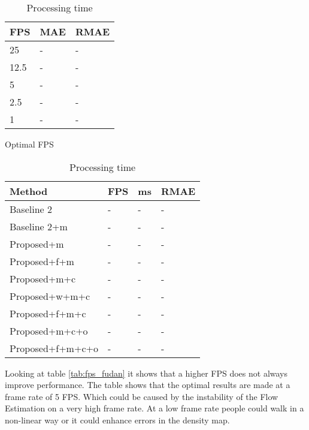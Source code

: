 \begin{table}[!htb]
\begin{minipage}{.5\linewidth}
\centering
\begin{tabular}{lll}
		\hline
		FPS                               & MAE & RMAE \\ \hline
		\multicolumn{1}{l|}{25}          & - & - \\
		\multicolumn{1}{l|}{12.5}        & - & - \\
		\multicolumn{1}{l|}{5}        & - & - \\
		\multicolumn{1}{l|}{2.5} & - & - \\
		\multicolumn{1}{l|}{1} & - & - \\ \hline
		\end{tabular}
\caption{\label{tab:fps_fudan} Optimal FPS}
\end{minipage}
\begin{minipage}{.5\linewidth}
\centering
\begin{tabular}{llll}
\hline
Method                             & FPS & ms & RMAE \\ \hline
\multicolumn{1}{l|}{Baseline 2}    & - & - & - \\
\multicolumn{1}{l|}{Baseline 2+m} & - & - & -\\
\multicolumn{1}{l|}{Proposed+m}      & - & - & - \\
\multicolumn{1}{l|}{Proposed+f+m} &- & - & - \\
\multicolumn{1}{l|}{Proposed+m+c}        & - & - & - \\
\multicolumn{1}{l|}{Proposed+w+m+c}        & - & - & - \\
\multicolumn{1}{l|}{Proposed+f+m+c}        & - & - & - \\
\multicolumn{1}{l|}{Proposed+m+c+o} & - & - & - \\
\multicolumn{1}{l|}{Proposed+f+m+c+o} & - & - & - \\ \hline
\end{tabular}
\caption{\label{tab:processing_fudan}Processing time}
\end{minipage} %
\end{table}

Looking at table \ref{tab:fps_fudan} it shows that a higher FPS does not always improve performance. The table shows that the optimal results are made at a frame rate of 5 FPS. Which could be caused by the instability of the Flow Estimation on a very high frame rate. At a low frame rate people could walk in a non-linear way or it could enhance errors in the density map.

